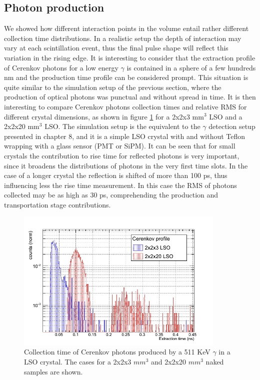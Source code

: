 \subsection{Photon production}
We showed how different interaction points in the volume entail rather different collection  time distributions. 
In a realistic setup the depth of interaction may vary at each scintillation event, thus the final pulse shape will reflect this variation in the rising edge.
It is interesting to consider that the extraction profile of Cerenkov photons for a low energy $\gamma$ is contained in a sphere of a few hundreds nm and the production time profile can be considered prompt. This situation is quite similar to the simulation setup of the previous section, where the production of optical photons was punctual and without spread in time.
It is then interesting to compare Cerenkov photons collection times and relative RMS for different crystal dimensions, as shown in figure \ref{fig:cer_coll} for a 2x2x3 mm$^{3}$ LSO and a 2x2x20 mm$^{3}$ LSO. The simulation setup is the equivalent to the $\gamma$ detection setup presented in chapter 8, and it is a simple LSO crystal with and without Teflon wrapping with a glass sensor (PMT or SiPM).
It can be seen that for small crystals the contribution to rise time for reflected photons is very important, since it broadens the distributions of photons in the very first time slots. In the case of a longer crystal the reflection is shifted of more than 100 ps, thus influencing less the rise time measurement. In this case the RMS of photons collected may be as high as 30 ps, comprehending the production and transportation stage contributions.
\begin{figure}[htbp]
\begin{center}
\includegraphics[width=10cm]{../Pictures/Chapter_6/cerenkov_collected.png}
\end{center}
\caption[Collection Cerenkov times for LSO naked]{Collection time of Cerenkov photons produced by a 511 KeV $\gamma$ in a LSO crystal. The cases for a 2x2x3 $mm^{3}$ and 2x2x20 $mm^{3}$ naked samples are shown.}
\label{fig:cer_coll}
\end{figure}

